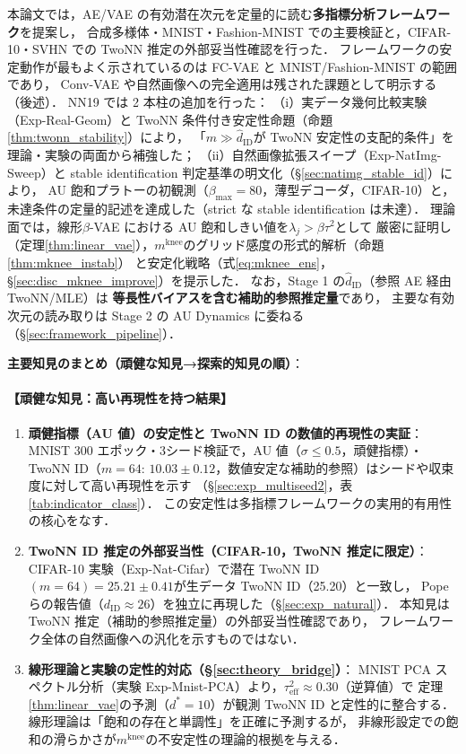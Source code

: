 \documentclass[11pt,a4paper]{jsarticle}
\newcommand{\mknee}{m^{\mathrm{knee}}}
\begin{document}
本論文では，AE/VAE の有効潜在次元を定量的に読む\textbf{多指標分析フレームワーク}を提案し，
合成多様体・MNIST・Fashion-MNIST での主要検証と，CIFAR-10・SVHN での TwoNN 推定の外部妥当性確認を行った．
フレームワークの安定動作が最もよく示されているのは FC-VAE と MNIST/Fashion-MNIST の範囲であり，
Conv-VAE や自然画像への完全適用は残された課題として明示する（後述）．
NN19 では 2 本柱の追加を行った：
（i）実データ幾何比較実験（Exp-Real-Geom）と TwoNN 条件付き安定性命題（命題\ref{thm:twonn_stability}）により，
「$m \gg \hat{d}_\mathrm{ID}$が TwoNN 安定性の支配的条件」を理論・実験の両面から補強した；
（ii）自然画像拡張スイープ（Exp-NatImg-Sweep）と stable identification 判定基準の明文化（§\ref{sec:natimg_stable_id}）により，
AU 飽和プラトーの初観測（$\beta_{\max}=80$，薄型デコーダ，CIFAR-10）と，
未達条件の定量的記述を達成した（strict な stable identification は未達）．
理論面では，線形$\beta$-VAE における AU 飽和しきい値を$\lambda_j > \beta\tau^2$として
厳密に証明し（定理\ref{thm:linear_vae}），$\mknee$のグリッド感度の形式的解析（命題\ref{thm:mknee_instab}）
と安定化戦略（式\eqref{eq:mknee_ens}，§\ref{sec:disc_mknee_improve}）を提示した．
なお，Stage 1 の$\hat{d}_\mathrm{ID}$（参照 AE 経由 TwoNN/MLE）は
\textbf{等長性バイアスを含む補助的参照推定量}であり，
主要な有効次元の読み取りは Stage 2 の AU Dynamics に委ねる（§\ref{sec:framework_pipeline}）．

\textbf{主要知見のまとめ（頑健な知見→探索的知見の順）}：

\paragraph{【頑健な知見：高い再現性を持つ結果】}
\begin{enumerate}
  \item \textbf{頑健指標（AU 値）の安定性と TwoNN ID の数値的再現性の実証}：
        MNIST 300 エポック・3シード検証で，AU 値（$\sigma \leq 0.5$，頑健指標）・
        TwoNN ID（$m=64$: $10.03 \pm 0.12$，数値安定な補助的参照）はシードや収束度に対して高い再現性を示す
        （§\ref{sec:exp_multiseed2}，表\ref{tab:indicator_class}）．
        この安定性は多指標フレームワークの実用的有用性の核心をなす．
  \item \textbf{TwoNN ID 推定の外部妥当性（CIFAR-10，TwoNN 推定に限定）}：
        CIFAR-10 実験（Exp-Nat-Cifar）で潜在 TwoNN ID$(m=64)=25.21\pm0.41$が生データ TwoNN ID（25.20）と一致し，
        Pope ら\cite{pope2021intrinsic}の報告値（$d_\mathrm{ID} \approx 26$）を独立に再現した（§\ref{sec:exp_natural}）．
        本知見は TwoNN 推定（補助的参照推定量）の外部妥当性確認であり，
        フレームワーク全体の自然画像への汎化を示すものではない．
  \item \textbf{線形理論と実験の定性的対応（§\ref{sec:theory_bridge}）}：
        MNIST PCA スペクトル分析（実験 Exp-Mnist-PCA）より，$\tau^2_\mathrm{eff} \approx 0.30$（逆算値）で
        定理\ref{thm:linear_vae}の予測（$d^*=10$）が観測 TwoNN ID と定性的に整合する．
        線形理論は「飽和の存在と単調性」を正確に予測するが，
        非線形設定での飽和の滑らかさが$\mknee$の不安定性の理論的根拠を与える．
\end{enumerate}
\end{document}

